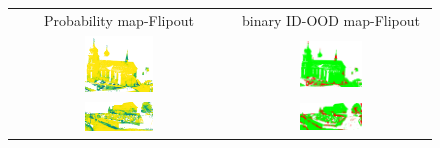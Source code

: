     \begin{figure}[h!]
        \centering
        \begin{tabular}{cc}
            Probability map-Flipout & binary ID-OOD map-Flipout \\
            \includegraphics[width=0.33\textwidth, height=0.18\textheight]{images/ood_imgs/fout_sem3d/fout_prob_1.pdf}& 
            \includegraphics[width=0.33\textwidth, height=0.18\textheight]{images/ood_imgs/fout_sem3d/fout_ood_auroc_1.pdf}\\

            \includegraphics[width=0.33\textwidth, height=0.18\textheight]{images/ood_imgs/fout_sem3d/fout_prob_2.pdf}& 
            \includegraphics[width=0.33\textwidth, height=0.18\textheight]{images/ood_imgs/fout_sem3d/fout_ood_auroc_2.pdf}\\


\end{tabular}
\end{figure}
